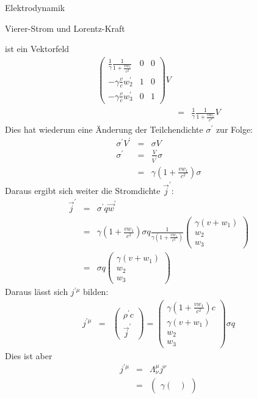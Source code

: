 \begin{chapter}{\titlestr}
\begin{section}{Elektrodynamik}
\begin{subsection}{Vierer-Strom und Lorentz-Kraft}
\begin{subsubsection}{ ist ein Vektorfeld}
\begin{eqnarray*}
\begin{pmatrix}
\frac{1}{\gamma}\frac{1}{1+\frac{vw_1}{c^2}}&0&0\\
-\gamma\frac{v}{c}w_2^\prime&1&0\\
-\gamma\frac{v}{c}w_3^\prime&0&1
\end{pmatrix}V\\
&=& \frac{1}{\gamma}\frac{1}{1+\frac{vw_1}{c^2}}V
\end{eqnarray*}
Dies hat wiederum eine Änderung der Teilchendichte $\sigma^\prime$ zur Folge:
\begin{eqnarray*}
\sigma^\prime V^\prime &=& \sigma V\\
\sigma^\prime &=& \frac{V}{V^\prime}\sigma\\
&=& \gamma\left(1+\frac{vw_1}{c^2}\right)\sigma
\end{eqnarray*}
Daraus ergibt sich weiter die Stromdichte $\vec{j}^\prime$:
\begin{eqnarray*}
\vec{j}^\prime &=& \sigma^\prime q\vec{w}^\prime\\
&=& \gamma\left(1+\frac{vw_1}{c^2}\right)\sigma q\frac{1}{\gamma \left(1+\frac{vw_1}{c^2}\right)}\begin{pmatrix}
\gamma \left(v+w_1\right)\\
w_2\\
w_3
\end{pmatrix}\\
&=& \sigma q\begin{pmatrix}
\gamma \left(v+w_1\right)\\
w_2\\
w_3
\end{pmatrix}
\end{eqnarray*}
Daraus lässt sich $j^{\prime \mu}$ bilden:
\begin{eqnarray*}
j^{\prime \mu} &=& \begin{pmatrix}
\rho^\prime c\\
\vec{j}^\prime
\end{pmatrix}=
\begin{pmatrix}
\gamma\left(1+\frac{vw_1}{c^2}\right) c\\
\gamma \left(v+w_1\right)\\
w_2\\
w_3
\end{pmatrix}\sigma q
\end{eqnarray*}
Dies ist aber
\begin{eqnarray*}
j^{\prime \mu} &=& \Lambda^\mu_\nu j^\nu\\
&=&\begin{pmatrix}
\gamma\begin{pmatrix}

\end{pmatrix}
\end{pmatrix}
\end{eqnarray*}
\end{subsubsection}
\end{subsection}
\end{section}
\end{chapter}
